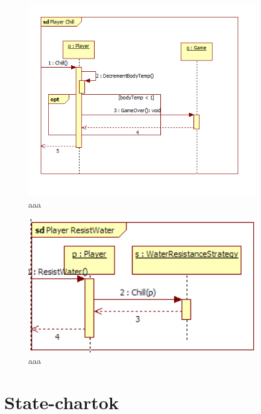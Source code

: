 \begin{figure}[H]
	\begin{center}
		\includegraphics[width=10cm]{chapters/chapter03/seqdiag/Player_Chill.png}
		\caption{aaa}
		\label{bbb}
	\end{center}
\end{figure}
\begin{figure}[H]
	\begin{center}
		\includegraphics[width=10cm]{chapters/chapter03/seqdiag/Player_ResistWater.png}
		\caption{aaa}
		\label{bbb}
	\end{center}
\end{figure}



\section{State-chartok}
\newpage

